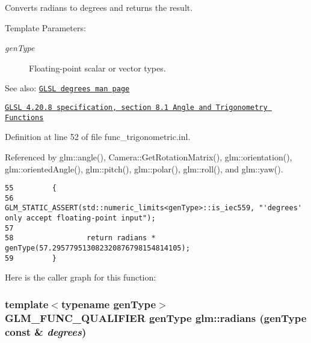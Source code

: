 Converts radians to degrees and returns the result.

\begin{Desc}
\item[Template Parameters:]
\begin{description}
\item[{\em genType}]Floating-point scalar or vector types.\end{description}
\end{Desc}
\begin{Desc}
\item[See also:]\href{http://www.opengl.org/sdk/docs/manglsl/xhtml/degrees.xml}{\tt GLSL degrees man page} 

\href{http://www.opengl.org/registry/doc/GLSLangSpec.4.20.8.pdf}{\tt GLSL 4.20.8 specification, section 8.1 Angle and Trigonometry Functions} \end{Desc}


Definition at line 52 of file func\_\-trigonometric.inl.

Referenced by glm::angle(), Camera::GetRotationMatrix(), glm::orientation(), glm::orientedAngle(), glm::pitch(), glm::polar(), glm::roll(), and glm::yaw().

\begin{Code}\begin{verbatim}55         {
56                 GLM_STATIC_ASSERT(std::numeric_limits<genType>::is_iec559, "'degrees' only accept floating-point input");
57 
58                 return radians * genType(57.295779513082320876798154814105);
59         }
\end{verbatim}
\end{Code}




Here is the caller graph for this function:\hypertarget{group__core__func__trigonometric_g87953103f3ac701b8440a7d904fa2e4d}{
\subsubsection[radians]{\setlength{\rightskip}{0pt plus 5cm}template$<$typename genType$>$ GLM\_\-FUNC\_\-QUALIFIER genType glm::radians (genType const \& {\em degrees})}}
\label{group__core__func__trigonometric_g87953103f3ac701b8440a7d904fa2e4d}


